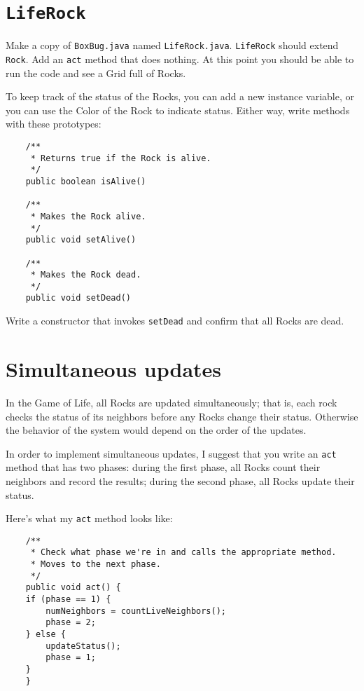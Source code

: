 \documentclass[12pt]{book}
\theoremstyle{definition}
\begin{document}
\section{{\tt LifeRock}}

Make a copy of {\tt BoxBug.java} named {\tt LifeRock.java}.
{\tt LifeRock} should extend {\tt Rock}.  Add an {\tt act} method
that does nothing.  At this point you should be able to run the
code and see a Grid full of Rocks.

To keep track of the status of the Rocks, you can add a new instance
variable, or you can use the Color of the Rock to indicate status.
Either way, write methods with these prototypes:

\begin{lstlisting}
    /**
     * Returns true if the Rock is alive.
     */
    public boolean isAlive() 

    /**
     * Makes the Rock alive.
     */
    public void setAlive() 

    /**
     * Makes the Rock dead.
     */
    public void setDead() 
\end{lstlisting}

Write a constructor that invokes {\tt setDead} and confirm that
all Rocks are dead.


\section{Simultaneous updates}

In the Game of Life, all Rocks are updated simultaneously; that is,
each rock checks the status of its neighbors before any Rocks
change their status.  Otherwise the behavior of the system would
depend on the order of the updates.

In order to implement simultaneous updates, I suggest that you write
an {\tt act} method that has two phases: during the first phase,
all Rocks count their neighbors and record the results; during the
second phase, all Rocks update their status.

Here's what my {\tt act} method looks like:

\begin{lstlisting}
    /**
     * Check what phase we're in and calls the appropriate method.
     * Moves to the next phase.
     */
    public void act() {
	if (phase == 1) {
	    numNeighbors = countLiveNeighbors();
	    phase = 2;
	} else {
	    updateStatus();
	    phase = 1;
	}
    }
\end{lstlisting}
\end{document}
